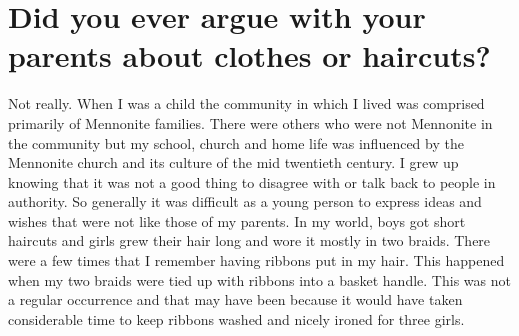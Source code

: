 \section{Did you ever argue with your parents about clothes or haircuts?}
Not really.
When I was a child the community in which I lived was comprised primarily of Mennonite families.
There were others who were not Mennonite in the community but my school, church and home life was influenced by the Mennonite church and its culture of the mid twentieth century.
I grew up knowing that it was not a good thing to disagree with or talk back to people in authority.
So generally it was difficult as a young person to express ideas and wishes that were not like those of my parents.
In my world, boys got short haircuts and girls grew their hair long and wore it mostly in two braids.
There were a few times that I remember having ribbons put in my hair.
This happened when my two braids were tied up with ribbons into a basket handle.
This was not a regular occurrence and that may have been because it would have taken considerable time to keep ribbons washed and nicely ironed for three girls.

